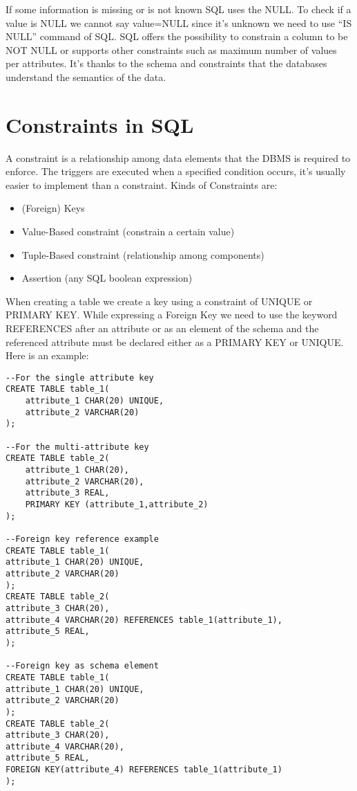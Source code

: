 \documentclass[a4page, 11pt]{article}
\begin{document}
If some information is missing or is not known SQL uses the NULL. To check if a value is NULL we cannot say value=NULL since it's unknown we need to use ``IS NULL'' command of SQL. SQL offers the possibility to constrain a column to be NOT NULL or supports other constraints such as maximum number of values per attributes.
It's thanks to the schema and constraints that the databases understand the semantics of the data.

\section{Constraints in SQL}
A constraint is a relationship among data elements that the DBMS is required to enforce. The triggers are executed when a specified condition occurs, it's usually easier to implement than a constraint. 
Kinds of Constraints are:
\begin{itemize}
	\item (Foreign) Keys
	\item Value-Based constraint (constrain a certain value)
	\item Tuple-Based constraint (relationship among components)
	\item Assertion (any SQL boolean expression)
\end{itemize}

When creating a table we create a key using a constraint of UNIQUE or PRIMARY KEY. While expressing a Foreign Key we need to use the keyword REFERENCES after an attribute or as an element of the schema and the referenced attribute must be declared either as a PRIMARY KEY or UNIQUE. Here is an example:
\begin{lstlisting}
--For the single attribute key
CREATE TABLE table_1(
	attribute_1 CHAR(20) UNIQUE,
	attribute_2 VARCHAR(20)
);

--For the multi-attribute key
CREATE TABLE table_2(
	attribute_1 CHAR(20),
	attribute_2 VARCHAR(20),
	attribute_3 REAL,
	PRIMARY KEY (attribute_1,attribute_2)
);

--Foreign key reference example
CREATE TABLE table_1(
attribute_1 CHAR(20) UNIQUE,
attribute_2 VARCHAR(20)
);
CREATE TABLE table_2(
attribute_3 CHAR(20),
attribute_4 VARCHAR(20) REFERENCES table_1(attribute_1),
attribute_5 REAL,
);

--Foreign key as schema element
CREATE TABLE table_1(
attribute_1 CHAR(20) UNIQUE,
attribute_2 VARCHAR(20)
);
CREATE TABLE table_2(
attribute_3 CHAR(20),
attribute_4 VARCHAR(20),
attribute_5 REAL,
FOREIGN KEY(attribute_4) REFERENCES table_1(attribute_1)
);
\end{lstlisting}
\end{document}
